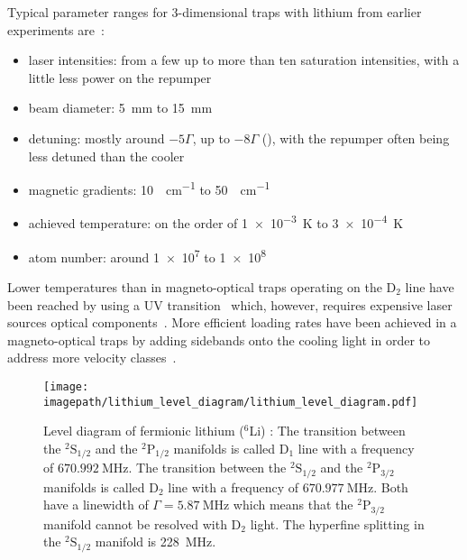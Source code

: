 Typical parameter ranges for 3-dimensional traps with lithium from earlier experiments are~\cite{
    tiecke_high-flux_2009,
    kawanaka_decay_1993,
    schunemann_magneto-optic_1998,
    mewes_simultaneous_1999,
    hilker_laser_2012,
    kerkmann_novel_2019,
    ladouceur_compact_2009,
    chen_lithium-cesium_2021,    
    burchianti_efficient_2014,
    li_enhanced_2015,
}:
\begin{itemize}
    \item laser intensities: from a few up to more than ten saturation intensities, with a little less power on the repumper
    \item beam diameter: \SI{5}{\milli\meter} to \SI{15}{\milli\meter}
    \item detuning: mostly around $-5\Gamma$, up to $-8 \Gamma$ (\cite{li_enhanced_2015}), with the repumper often being less detuned than the cooler 
    \item magnetic gradients: \SI{10}{\gauss\per\centi\meter} to \SI{50}{\gauss\per\centi\meter}
    \item achieved temperature: on the order of \SI{1e-3}{\kelvin} to \SI{3e-4}{\kelvin}
    \item atom number: around \SI{1e7}{} to \SI{1e8}{}
\end{itemize}

Lower temperatures than in magneto-optical traps operating on the D$_2$ line have been reached by using a UV transition~\cite{duarte_all-optical_2011,omran_microscopic_2015} which, however, requires expensive laser sources optical components~\cite{burchianti_efficient_2014}. More efficient loading rates have been achieved in a magneto-optical traps by adding sidebands onto the cooling light in order to address more velocity classes~\cite{li_enhanced_2015}.


\begin{figure}
    \centering
    \texttt{[image: \\imagepath/lithium\_level\_diagram/lithium\_level\_diagram.pdf]}
    \caption{Level diagram of fermionic lithium ($^6$Li) \cite{gehm_properties_2003, scherf_re-measurement_1996}: The transition between the  $^2\text{S}_{1/2}$ and the $^2\text{P}_{1/2}$ manifolds is called D$_1$ line with a frequency of $\SI{670.992}{\mega\hertz}$. The transition between the  $^2\text{S}_{1/2}$ and the $^2\text{P}_{3/2}$ manifolds is called D$_2$ line with a frequency of $\SI{670.977}{\mega\hertz}$. Both have a linewidth of $\Gamma = \SI{5.87}{\mega\hertz}$ which means that the $^2\text{P}_{3/2}$ manifold cannot be resolved with D$_2$ light. The hyperfine splitting in the $^2\text{S}_{1/2}$ manifold is \SI{228}{\mega\hertz}.}
    \label{fig:lithium_level_diagram}
\end{figure}

